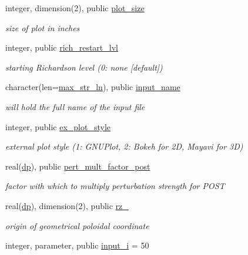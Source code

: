 \begin{DoxyCompactItemize}
integer, dimension(2), public \hyperlink{namespacenum__vars_a3bd355d04302c5d45685a0e1e3f6b1f6}{plot\+\_\+size}
\begin{DoxyCompactList}\small\item\em size of plot in inches \end{DoxyCompactList}\item 
integer, public \hyperlink{namespacenum__vars_ac4bc885e8034c285bf0a9b76a832a738}{rich\+\_\+restart\+\_\+lvl}
\begin{DoxyCompactList}\small\item\em starting Richardson level (0\+: none \mbox{[}default\mbox{]}) \end{DoxyCompactList}\item 
character(len=\hyperlink{namespacenum__vars_a3ff2bb983ee80a6735277d6789e6ce7c}{max\+\_\+str\+\_\+ln}), public \hyperlink{namespacenum__vars_a1a16a5fdda7aaacdffd14f1ad29f5e8b}{input\+\_\+name}
\begin{DoxyCompactList}\small\item\em will hold the full name of the input file \end{DoxyCompactList}\item 
integer, public \hyperlink{namespacenum__vars_aac52d1fda60883bea62738fe0ecd7527}{ex\+\_\+plot\+\_\+style}
\begin{DoxyCompactList}\small\item\em external plot style (1\+: G\+N\+U\+Plot, 2\+: Bokeh for 2D, Mayavi for 3D) \end{DoxyCompactList}\item 
real(\hyperlink{namespacenum__vars_a03802aa2bd86439d7a9370836fabf3f2}{dp}), public \hyperlink{namespacenum__vars_aa53d6f71e297c4d8be05907bb7dbffce}{pert\+\_\+mult\+\_\+factor\+\_\+post}
\begin{DoxyCompactList}\small\item\em factor with which to multiply perturbation strength for P\+O\+ST \end{DoxyCompactList}\item 
real(\hyperlink{namespacenum__vars_a03802aa2bd86439d7a9370836fabf3f2}{dp}), dimension(2), public \hyperlink{namespacenum__vars_aac566d69891d40b90df6b90d18e16039}{rz\+\_}
\begin{DoxyCompactList}\small\item\em origin of geometrical poloidal coordinate \end{DoxyCompactList}\item 
integer, parameter, public \hyperlink{namespacenum__vars_aba3a56e056e4851ee31a33a448613863}{input\+\_\+i} = 50

\end{DoxyCompactItemize}
